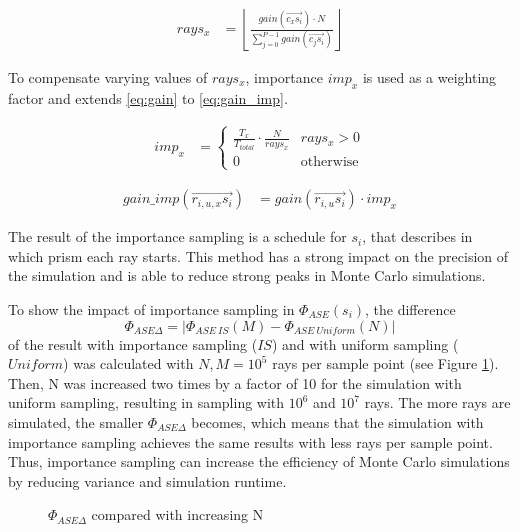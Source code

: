 \begin{align}
  rays_x       &= \left\lfloor\frac{gain(\overrightarrow{c_xs_i}) \cdot N}{\sum^{P-1}_{j=0} gain(\overrightarrow{c_js_i})}\right\rfloor
\end{align}

To compensate varying values of $rays_x$, importance $imp_x$ is used as a weighting factor
and extends \eqref{eq:gain} to \eqref{eq:gain_imp}.

\begin{align}
imp_x &= 
\begin{cases}
\frac{T_x}{T_{total}} \cdot \frac{N}{rays_x} &rays_x > 0\\
0 &\text{otherwise}
\end{cases}
\end{align}

\begin{align}
\label{eq:gain_imp}
gain\_imp(\overrightarrow{r_{i,u,x}s_i})        &= gain(\overrightarrow{r_{i,u}s_i}) \cdot imp_x
\end{align}


The result of the importance sampling is a schedule for $s_i$, that
describes in which prism each ray starts.
This method has a strong impact on the precision of the simulation
and is able to reduce strong peaks in Monte Carlo simulations.

To show the impact of importance sampling in $\Phi_{ASE}(s_i)$, the difference
\[\Phi_{ASE\Delta} = |\Phi_{ASE~IS}(M) - \Phi_{ASE~Uniform}(N)|\] of the 
result with importance sampling ($IS$) and with uniform sampling ($Uniform$) was calculated with 
$N,M = 10^5$ rays per sample point (see Figure \ref{graphic:importance}). 
Then, N was increased two times by a factor of 10 for the simulation with uniform sampling, resulting in sampling with $10^6$ and $10^7$ rays.
The more rays are simulated, the smaller $\Phi_{ASE\Delta}$ becomes, which 
means that the simulation
with importance sampling achieves the same results with less
rays per sample point. Thus, importance sampling can increase the
efficiency of Monte Carlo simulations by reducing variance 
and simulation runtime. 
\begin{figure}[H]
  \centerline
  {}
  \caption{$\Phi_{ASE\Delta}$ compared with increasing N}
  \label{graphic:importance}
\end{figure}

